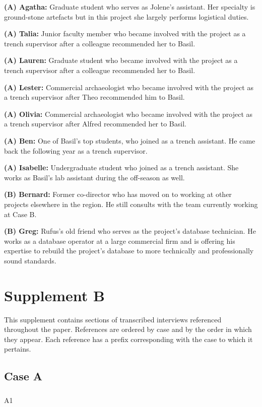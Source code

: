 \documentclass[
]{article}
\makeatletter
\let\oldsubparagraph\subparagraph
\renewcommand{\subparagraph}{
    \@ifstar
      \xxxSubParagraphStar
      \xxxSubParagraphNoStar
  }
\newcommand{\xxxSubParagraphStar}[1]{\oldsubparagraph*{#1}\mbox{}}
\newcommand{\xxxSubParagraphNoStar}[1]{\oldsubparagraph{#1}\mbox{}}
\makeatother
\begin{document}
\textbf{(A) Agatha:} Graduate student who serves as Jolene's assistant.
Her specialty is ground-stone artefacts but in this project she largely
performs logistical duties.

\textbf{(A) Talia:} Junior faculty member who became involved with the
project as a trench supervisor after a colleague recommended her to
Basil.

\textbf{(A) Lauren:} Graduate student who became involved with the
project as a trench supervisor after a colleague recommended her to
Basil.

\textbf{(A) Lester:} Commercial archaeologist who became involved with
the project as a trench supervisor after Theo recommended him to Basil.

\textbf{(A) Olivia:} Commercial archaeologist who became involved with
the project as a trench supervisor after Alfred recommended her to
Basil.

\textbf{(A) Ben:} One of Basil's top students, who joined as a trench
assistant. He came back the following year as a trench supervisor.

\textbf{(A) Isabelle:} Undergraduate student who joined as a trench
assistant. She works as Basil's lab assistant during the off-season as
well.

\textbf{(B) Bernard:} Former co-director who has moved on to working at
other projects elsewhere in the region. He still consults with the team
currently working at Case B.

\textbf{(B) Greg:} Rufus's old friend who serves as the project's
database technician. He works as a database operator at a large
commercial firm and is offering his expertise to rebuild the project's
database to more technically and professionally sound standards.

\section{Supplement B}\label{supplement-b}

This supplement contains sections of transcribed interviews referenced
throughout the paper. References are ordered by case and by the order in
which they appear. Each reference has a prefix corresponding with the
case to which it pertains.

\subsection{Case A}\label{case-a}

\subparagraph{A1}\label{sec-A1}
\end{document}
